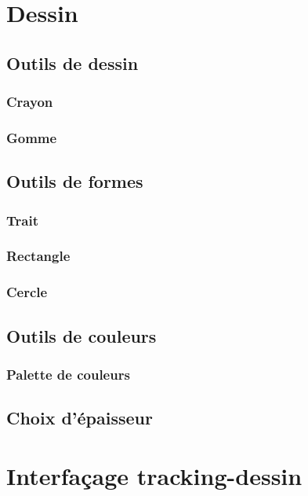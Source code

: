 \documentclass[11pt,a4paper,oldfontcommands]{memoir}
\begin{document}
\newpage

\section{Dessin}

\subsection{Outils de dessin}

\subsubsection{Crayon}

\subsubsection{Gomme}

\subsection{Outils de formes}

\subsubsection{Trait}

\subsubsection{Rectangle}

\subsubsection{Cercle}

\subsection{Outils de couleurs}

\subsubsection{Palette de couleurs}

\subsection{Choix d'épaisseur}

\section{Interfaçage tracking-dessin}
\end{document}
